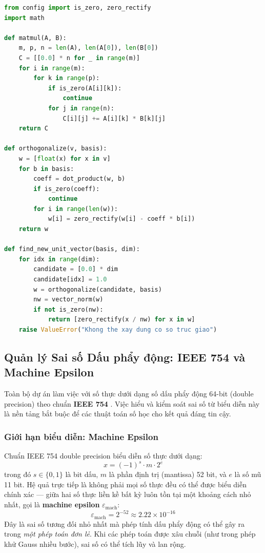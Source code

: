 \begin{lstlisting}[language=Python, caption={Trích đoạn \texttt{utils.py}: một số hàm tiện ích nội bộ quan trọng}]
from config import is_zero, zero_rectify
import math

def matmul(A, B):
    m, p, n = len(A), len(A[0]), len(B[0])
    C = [[0.0] * n for _ in range(m)]
    for i in range(m):
        for k in range(p):
            if is_zero(A[i][k]):
                continue
            for j in range(n):
                C[i][j] += A[i][k] * B[k][j]
    return C

def orthogonalize(v, basis):
    w = [float(x) for x in v]
    for b in basis:
        coeff = dot_product(w, b)
        if is_zero(coeff):
            continue
        for i in range(len(w)):
            w[i] = zero_rectify(w[i] - coeff * b[i])
    return w

def find_new_unit_vector(basis, dim):
    for idx in range(dim):
        candidate = [0.0] * dim
        candidate[idx] = 1.0
        w = orthogonalize(candidate, basis)
        nw = vector_norm(w)
        if not is_zero(nw):
            return [zero_rectify(x / nw) for x in w]
    raise ValueError("Khong the xay dung co so truc giao")
\end{lstlisting}

\subsection{Quản lý Sai số Dấu phẩy động: IEEE 754 và Machine Epsilon}
\label{sec:floating_point}

Toàn bộ dự án làm việc với số thực dưới dạng số dấu phẩy động 64-bit (double precision) theo chuẩn \textbf{IEEE 754} \cite{ieee754}. Việc hiểu và kiểm soát sai số từ biểu diễn này là nền tảng bắt buộc để các thuật toán số học cho kết quả đáng tin cậy.

\subsubsection{Giới hạn biểu diễn: Machine Epsilon}

Chuẩn IEEE 754 double precision biểu diễn số thực dưới dạng:
\begin{equation}
    x = (-1)^s \cdot m \cdot 2^e
\end{equation}
trong đó $s \in \{0,1\}$ là bit dấu, $m$ là phần định trị (mantissa) 52 bit, và $e$ là số mũ 11 bit. Hệ quả trực tiếp là không phải mọi số thực đều có thể được biểu diễn chính xác --- giữa hai số thực liền kề bất kỳ luôn tồn tại một khoảng cách nhỏ nhất, gọi là \textbf{machine epsilon} $\varepsilon_\text{mach}$:
\begin{equation}
    \varepsilon_\text{mach} = 2^{-52} \approx 2.22 \times 10^{-16}
\end{equation}
Đây là sai số tương đối nhỏ nhất mà phép tính dấu phẩy động có thể gây ra trong \textit{một phép toán đơn lẻ}. Khi các phép toán được xâu chuỗi (như trong phép khử Gauss nhiều bước), sai số có thể tích lũy và lan rộng.

